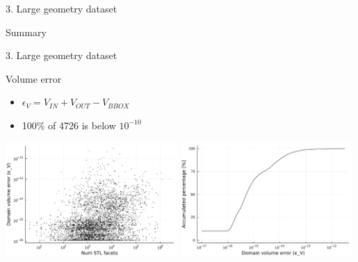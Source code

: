 \documentclass{beamer}
\begin{document}
\begin{frame}{3. Large geometry dataset}
  \begin{block}{Summary}

  \end{block}

\end{frame}


\begin{frame}{3. Large geometry dataset}



  \begin{block}{Volume error}
  \begin{itemize}
    \item
      $\epsilon_V = V_{IN} + V_{OUT} - V_{BBOX}$
    \item
      100\% of 4726 is below $10^{-10}$
  \end{itemize}
  \end{block}

  \includegraphics[width=0.49\textwidth]{../analysis/plots/num_stl_facets_volume_error}
  \includegraphics[width=0.49\textwidth]{../analysis/plots/histogram_volume_error}
\end{frame}
\end{document}
